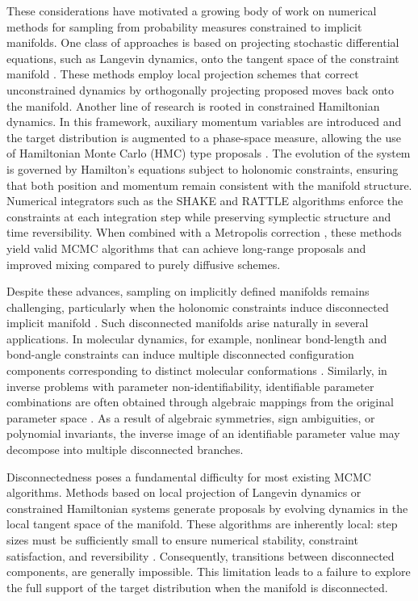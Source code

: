 \documentclass[12pt]{article}
\begin{document}
These considerations have motivated a growing body of work on numerical methods for sampling from probability measures constrained to implicit manifolds. One class of approaches is based on projecting stochastic differential equations, such as Langevin dynamics, onto the tangent space of the constraint manifold \citep{J4, J10, J9}. These methods employ local projection schemes that correct unconstrained dynamics by orthogonally projecting proposed moves back onto the manifold. 
Another line of research is rooted in constrained Hamiltonian dynamics. In this framework, auxiliary momentum variables are introduced and the target distribution is augmented to a phase-space measure, allowing the use of Hamiltonian Monte Carlo (HMC) type proposals \citep{M2, M3}. The evolution of the system is governed by Hamilton’s equations subject to holonomic constraints, ensuring that both position and momentum remain consistent with the manifold structure. Numerical integrators such as the SHAKE and RATTLE algorithms \citep{J11} enforce the constraints at each integration step while preserving symplectic structure and time reversibility. When combined with a Metropolis correction \citep{J17}, these methods yield valid MCMC algorithms that can achieve long-range proposals and improved mixing compared to purely diffusive schemes.

Despite these advances, sampling on implicitly defined manifolds remains challenging, particularly when the holonomic constraints induce disconnected implicit manifold \citep{J12}. Such disconnected manifolds arise naturally in several applications. In molecular dynamics, for example, nonlinear bond-length and bond-angle constraints can induce multiple disconnected configuration components corresponding to distinct molecular conformations \citep{J13}. Similarly, in inverse problems with parameter non-identifiability, identifiable parameter combinations are often obtained through algebraic mappings from the original parameter space \citep{J14}. As a result of algebraic symmetries, sign ambiguities, or polynomial invariants, the inverse image of an identifiable parameter value may decompose into multiple disconnected branches.

Disconnectedness poses a fundamental difficulty for most existing MCMC algorithms. Methods based on local projection of Langevin dynamics or constrained Hamiltonian systems generate proposals by evolving dynamics in the local tangent space of the manifold. These algorithms are inherently local: step sizes must be sufficiently small to ensure numerical stability, constraint satisfaction, and reversibility \citep{M5}. Consequently, transitions between disconnected components, are generally impossible. This limitation leads to a failure to explore the full support of the target distribution when the manifold is disconnected.
\end{document}
